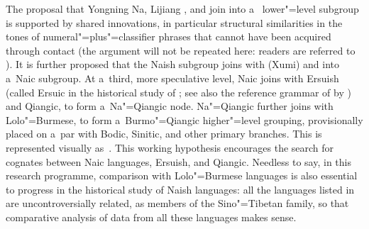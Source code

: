 {\largerpage}
The proposal that Yongning Na, Lijiang , and  join into a~ lower"=level
subgroup is supported by shared innovations, in particular structural similarities in the tones of {numeral}"=plus"=classifier phrases that cannot have been acquired through contact (the argument will not be repeated here: readers are referred to \citealt{michaud2011c}). It is further proposed that
the {Naish} subgroup joins with  (Xumi) and  into a~Naic subgroup. At a~third, more speculative
level, {Naic} joins with {Ersuish} (called {Ersuic} in the historical study of \citealt{yu2012}; see also the reference grammar of  by \citealt{zhang2013ersu}) and Qiangic, to form
a~Na"=Qiangic node. Na"=Qiangic further joins with Lolo"={Burmese}, to form a~Burmo"={Qiangic} higher"=level
grouping, provisionally placed on a~par with Bodic, {Sinitic}, and other primary branches. This is
represented visually as~. This working hypothesis encourages the search for cognates between {Naic} languages, {Ersuish}, and
Qiangic. Needless to say, in this research programme, comparison with Lolo"={Burmese} languages is also
essential to progress in the historical study of {Naish} languages: all the languages listed in
are uncontroversially related, as members of the Sino"=Tibetan family, so that comparative analysis
of data from all these languages makes sense. 


